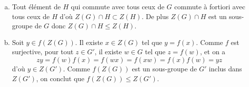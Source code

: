 \begin{enumerate}[a)]
\item Tout élément de $H$ qui commute avec tous ceux de $G$ commute à fortiori
avec tous ceux de $H$ d'où $Z(G)\cap H \subset Z(H)$. De plus $Z(G) \cap H$ est
un sous-groupe de $G$ donc $Z(G)\cap H\leqslant Z(H)$.

\item Soit $y\in f(Z(G))$. Il existe $x\in Z(G)$ tel que $y = f(x)$. Comme $f$
est surjective, pour tout $z\in G'$, il existe $w\in G$ tel que $z=f(w)$, et on
a
\[
  zy = f(w)f(x) = f(wx) = f(xw) = f(x)f(w) = yz
\]
d'où $y\in Z(G')$. Comme $f(Z(G))$ est un sous-groupe de $G'$ inclus dans
$Z(G')$, on conclut que $f(Z(G))\leqslant Z(G')$.
\end{enumerate}
